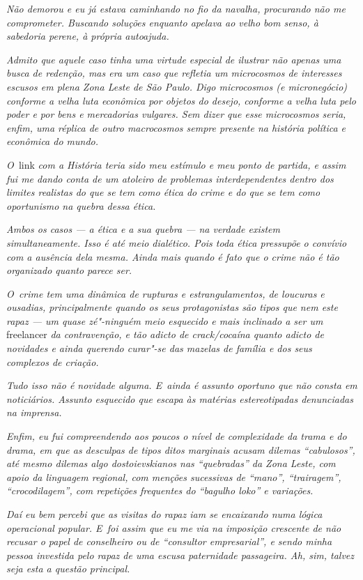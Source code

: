 \emph{Não demorou e eu já estava caminhando no fio da navalha,
procurando não me comprometer. Buscando soluções enquanto apelava ao
velho bom senso, à sabedoria perene, à própria autoajuda.}~

\emph{Admito que aquele caso tinha uma virtude especial de ilustrar não
apenas uma busca de redenção, mas era um caso que refletia um
microcosmos de interesses escusos em plena Zona Leste de São Paulo. Digo
microcosmos (e micronegócio) conforme a velha luta econômica por objetos
do desejo, conforme a velha luta pelo poder e por bens e mercadorias
vulgares. Sem dizer que esse microcosmos seria, enfim, uma réplica de
outro macrocosmos sempre presente na história política e econômica do
mundo.}~

\emph{O~}link \emph{com a História teria sido meu estímulo e meu ponto de
partida, e assim fui me dando conta de um atoleiro de problemas
interdependentes dentro dos limites realistas do que se tem como ética
do crime e do que se tem como oportunismo na quebra dessa ética.}~

\emph{Ambos os casos --- a ética e a sua quebra --- na verdade existem
simultaneamente. Isso é até meio dialético. Pois toda ética pressupõe o
convívio com a ausência dela mesma. Ainda mais quando é fato que o crime
não é tão organizado quanto parece ser.}~

\emph{O~crime tem uma dinâmica de rupturas e estrangulamentos, de
loucuras e ousadias, principalmente quando os seus protagonistas são
tipos que nem este rapaz --- um quase zé"-ninguém meio esquecido e mais
inclinado a ser um} freelancer \emph{da contravenção, e tão adicto de
crack/cocaína quanto adicto de novidades e ainda querendo curar"-se das
mazelas de família e dos seus complexos de criação.}~

\emph{Tudo isso não é novidade alguma. E~ainda é assunto oportuno que
não consta em noticiários. Assunto esquecido que escapa às matérias
estereotipadas denunciadas na imprensa.}

\emph{Enfim, eu fui compreendendo aos poucos o nível de complexidade da
trama e do drama, em que as desculpas de tipos ditos marginais acusam
dilemas ``cabulosos'', até mesmo dilemas algo dostoievskianos nas
``quebradas'' da Zona Leste, com apoio da linguagem regional, com
menções sucessivas de ``mano'', ``trairagem'', ``crocodilagem'', com
repetições frequentes do ``bagulho loko'' e variações.}~

\emph{Daí eu bem percebi que as visitas do rapaz iam se encaixando numa
lógica operacional popular. E~foi assim que eu me via na imposição
crescente de não recusar o papel de conselheiro ou de ``consultor
empresarial'', e sendo minha pessoa investida pelo rapaz de uma escusa
paternidade passageira. Ah, sim, talvez seja esta a questão principal.}~

